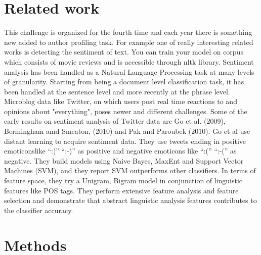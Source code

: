 \documentclass{llncs}
\begin{document}
\newpage

\section{Related work}\label{sec:Others}
This challenge is organized for the fourth time and each year there is something new added to author profiling task. For example one of really interesting related works is detecting the sentiment of text. You can train your model on corpus which consists of movie reviews and is accessible through nltk\cite{nltk} library. Sentiment analysis has been handled as a Natural Language Processing task at many levels of granularity. Starting from being a document level classification task, it has been handled at the sentence level and more recently at the phrase level. Microblog data like Twitter, on which users post real time reactions to and opinions about "everything", poses newer and different challenges. Some of the early results on sentiment analysis of Twitter data are Go et al. (2009), Bermingham amd Smeaton, (2010) and Pak and Paroubek (2010). Go et al use distant learning to acquire sentiment data. They use tweets ending in positive emoticonslike “:)” “:-)” as positive and negative emoticons like “:(” “:-(” as negative. They build models using Naive Bayes, MaxEnt and Support Vector Machines (SVM), and they report SVM outperforms other classifiers. In terms of feature space, they try a Unigram, Bigram model in conjunction of linguistic features like POS tags. They perform extensive feature analysis and feature selection and demonstrate that abstract linguistic analysis features contributes to the classifier accuracy.

\section{Methods}\label{sec:Others}
\end{document}
